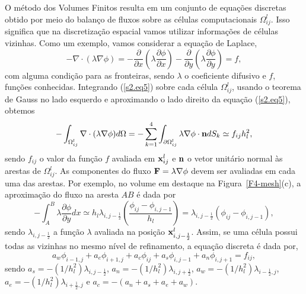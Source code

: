 \documentclass[12pt, brazil]{article}
\begin{document}
O método dos Volumes Finitos resulta em um conjunto de equações discretas obtido por meio do balanço de fluxos sobre as células computacionais $\Omega^l_{ij}$. Isso significa que na discretização espacial vamos utilizar informações de células vizinhas.  Como um exemplo, vamos considerar a equação de Laplace,  
\begin{equation}\label{s2.eq5}
-\nabla\cdot(\lambda\nabla \phi) = -\dfrac{\partial}{\partial x}\left(\lambda\dfrac{\partial\phi}{\partial x}\right) - \dfrac{\partial}{\partial y}\left(\lambda\dfrac{\partial\phi}{\partial y}\right) = f,
\end{equation}
com alguma condição para as fronteiras, sendo $\lambda$ o coeficiente difusivo e $f$, funções conhecidas. Integrando (\ref{s2.eq5}) sobre cada célula $\Omega^l_{ij}$, usando o teorema de Gauss no lado esquerdo e aproximando o lado direito da equação (\ref{s2.eq5}), obtemos
\begin{equation}\label{s2.eq6}
-\int_{\Omega_{ij}^l}\nabla\cdot(\lambda\nabla \phi)d\Omega  = -\sum_{k=1}^4\int_{\partial\Omega_{ij}^l}\lambda\nabla\phi\cdot{\bf n}dS_k \simeq f_{ij}h_l^2,
\end{equation}
sendo $f_{ij}$ o valor da função $f$ avaliada em ${\bf x}^l_{ij}$ e ${\bf n}$ o vetor unitário normal às arestas de $\Omega_{ij}^l$. As componentes do fluxo ${\bf F} = \lambda\nabla \phi$ devem ser avaliadas em cada uma das arestas. Por exemplo, no volume em destaque na Figura~\ref{F4-mesh}(c), a aproximação do fluxo na aresta $AB$ é dada por
\begin{equation}\label{s2.eq7}
-\int_A^B\lambda\dfrac{\partial\phi}{\partial y}dx \simeq h_l\lambda_{i,j-\frac{1}{2}}\left(\dfrac{\phi_{ij}-\phi_{i,j-1}}{h_l}\right)=\lambda_{i,j-\frac{1}{2}}(\phi_{ij}-\phi_{i,j-1}),
\end{equation}
sendo $\lambda_{i,j-\frac{1}{2}}$ a função $\lambda$ avaliada na posição ${\bf x}^l_{i,j-\frac{1}{2}}$. Assim, se uma célula possui todas as vizinhas no mesmo nível de refinamento, a equação discreta é dada por,
\begin{equation}\label{s2.eq8}
a_w\phi_{i-1,j}+a_e\phi_{i+1,j}+a_c\phi_{ij}+a_s\phi_{i,j-1}+a_n\phi_{i,j+1} = f_{ij},
\end{equation}
sendo $a_s=-(1/h_l^2)\lambda_{i,j-\frac{1}{2}}$, $a_n=-(1/h_l^2)\lambda_{i,j+\frac{1}{2}}$, $a_w=-(1/h_l^2)\lambda_{i-\frac{1}{2},j}$, $a_e=-(1/h_l^2)\lambda_{i+\frac{1}{2},j}$ e $a_c=-(a_n+a_s+a_e+a_w)$. 
\end{document}
